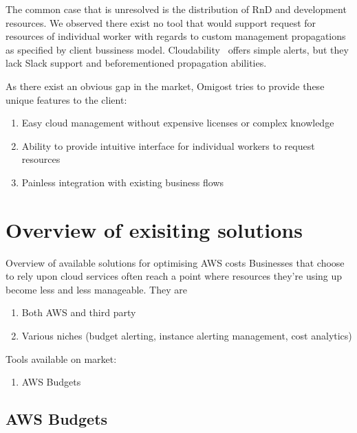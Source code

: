 \documentclass[licencjacka,en]{thesisclass}
\begin{document}
        The common case that is unresolved is the distribution of RnD and development resources.
        We observed there exist no tool that would support request for resources of individual worker with regards to custom management propagations as specified by client bussiness model.
        Cloudability~\cite{CloudabilityAlerts} offers simple alerts, but they lack Slack support and beforementioned propagation abilities.

        As there exist an obvious gap in the market, Omigost tries to provide these unique features to the client:

        \begin{enumerate}
            \item Easy cloud management without expensive licenses or complex knowledge
            \item Ability to provide intuitive interface for individual workers to request resources
            \item Painless integration with existing business flows
        \end{enumerate}

    \section{Overview of exisiting solutions}
    
        Overview of available solutions for optimising AWS costs
        Businesses that choose to rely upon cloud services often reach a point where resources they’re using up become less and less manageable. They are 
        
        \begin{enumerate}
            \item Both AWS and third party
            \item Various niches (budget alerting, instance alerting management, cost analytics)
        \end{enumerate}

        Tools available on market:
        
        \begin{enumerate}
            \item AWS Budgets
        \end{enumerate}
        
        \subsection{AWS Budgets}
\end{document}
